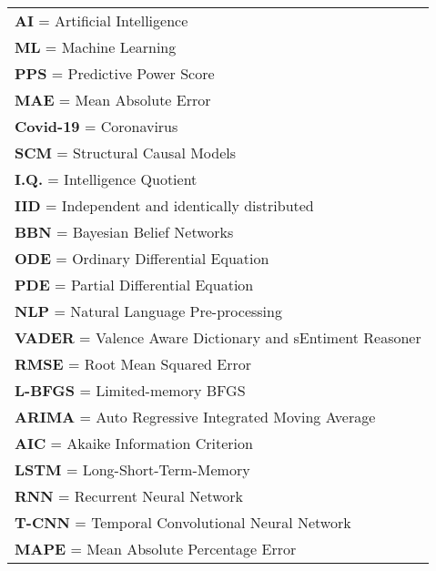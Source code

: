 \newpage
{}

\begin{Listofabbreviations}

\begin{center}
    \begin{tabular}{@{}l@{}}
    \textbf{AI} = Artificial Intelligence \\
    \textbf{ML} = Machine Learning \\
    \textbf{PPS} = Predictive Power Score \\
    \textbf{MAE} = Mean Absolute Error \\
    \textbf{Covid-19} = Coronavirus \\
    \textbf{SCM} = Structural Causal Models \\
    \textbf{I.Q.} = Intelligence Quotient \\
    \textbf{IID} = Independent and identically distributed \\
    \textbf{BBN} = Bayesian Belief Networks \\
    \textbf{ODE} = Ordinary Differential Equation \\
    \textbf{PDE} = Partial Differential Equation \\
    \textbf{NLP} = Natural Language Pre-processing \\
    \textbf{VADER} = Valence Aware Dictionary and sEntiment Reasoner \\
    \textbf{RMSE} = Root Mean Squared Error \\ 
    \textbf{L-BFGS} = Limited-memory BFGS \\ 
    \textbf{ARIMA} = Auto Regressive Integrated Moving Average \\
    \textbf{AIC} = Akaike Information Criterion \\
    \textbf{LSTM} = Long-Short-Term-Memory \\
    \textbf{RNN} = Recurrent Neural Network \\
    \textbf{T-CNN} = Temporal Convolutional Neural Network \\
    \textbf{MAPE} = Mean Absolute Percentage Error \\
    \end{tabular}
\end{center}

\end{Listofabbreviations}